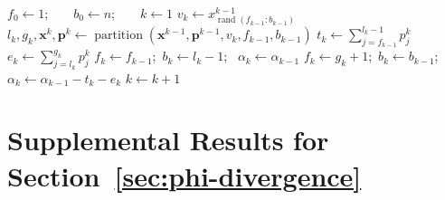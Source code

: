\begin{algorithm}
  \caption{\texttt{QuickVaR}: Non-recursive adaptation of \cref{alg:quick-quantile}} \label{alg:quickvar-nonrecursive}
  \Input{vector $\bm{x}^0$, pmf $\bm{p}^0$ and $\alpha_0 \in [0,1)$}
  $f_0 \gets 1$;~~~~$b_0 \gets n$;~~~~$k\gets 1$ \;
   {
     $v_k \gets x^{k-1}_{\operatorname{rand}(f_{k-1}{:}b_{k-1})}$  
     $l_k, g_k, \bm{x}^k, \bm{p}^k \gets \operatorname{partition}(\bm{x}^{k-1}, \bm{p}^{k-1}, v_k, f_{k-1}, b_{k-1})$
     \label{line:partion_line}    
    $t_k \gets \sum_{j=f_{k-1}}^{l_k-1} p^k_j$ \; 
    $e_k \gets \sum_{j = l_k}^{g_k} p^{k}_j $ \;  
    {
      $f_k \gets f_{k-1}$;~$b_k \gets l_k-1$;~
      $\alpha_k \gets \alpha_{k-1}$
    }
    {
      $f_k \gets g_k+1$;~$b_k \gets b_{k-1}$;~$\alpha_k \gets \alpha_{k-1} - t_k - e_k$
    }
    $k \gets k + 1$\; 
  }
  \;
\end{algorithm}


\section{Supplemental Results for Section~\ref{sec:phi-divergence}}

